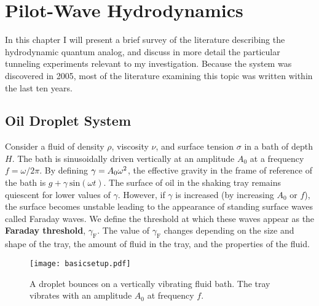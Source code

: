 \chapter{Pilot-Wave Hydrodynamics}
\label{Ch1}

In this chapter I will present a brief survey of the literature describing the hydrodynamic quantum analog, and discuss in more detail the particular tunneling experiments relevant to my investigation. Because the system was discovered in 2005, most of the literature examining this topic was written within the last ten years.


\section{Oil Droplet System}
	    \label{parameters}
	       Consider a fluid of density $\rho$, viscosity $\nu$, and surface tension $\sigma$ in a bath of depth $H$. The bath is sinusoidally driven vertically at an amplitude $A_0$ at a frequency $f=\omega/{2\pi}$. By defining $\mathnormal{\gamma}=A_0\omega^2$, the effective gravity in the frame of reference of the bath is $g+\gamma~\mathrm{sin}(\omega t)$. The surface of oil in the shaking tray remains quiescent for lower values of $\gamma$. However, if  $\gamma$ is increased (by increasing $A_0$ or $f$), the surface becomes unstable leading to the appearance of standing surface waves called Faraday waves. We define the threshold at which these waves appear as the \textbf{Faraday threshold}, $\gamma_\mathrm{F}$. The value of $\gamma_\mathrm{F}$ changes depending on the size and shape of the tray, the amount of fluid in the tray, and the properties of the fluid. 
	       
	   \begin{figure}[h]
	       \centering
	    \texttt{[image: basicsetup.pdf]}
	     \caption{A droplet bounces on a vertically vibrating fluid bath. The tray vibrates with an amplitude $A_0$ at frequency $f$.}
	 \label{basic}
	\end{figure}
	       

